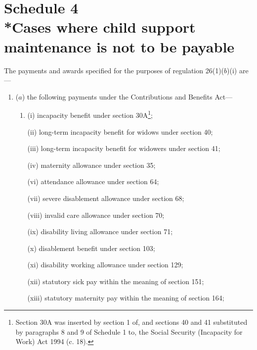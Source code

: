 \documentclass[a4paper]{article}
\newcommand{\parthead}{}
\begin{document}
\part[Schedule 4 --- Cases where child support maintenance is not to be payable]{Schedule 4\\*Cases where child support maintenance is not to be payable}

\renewcommand\parthead{--- Schedule 4}

The payments and awards specified for the purposes of regulation 26(1)($b$)(i) are—
\begin{enumerate}\item[]
($a$) the following payments under the Contributions and Benefits Act—
\begin{enumerate}\item[]
%
%

(i) incapacity benefit under section 30A\footnote{\frenchspacing Section 30A was inserted by section 1 of, and sections 40 and 41 substituted by paragraphs 8 and 9 of Schedule 1 to, the Social Security (Incapacity for Work) Act 1994 (c. 18).};

(ii) long-term incapacity benefit for widows under section 40;

(iii) long-term incapacity benefit for widowers under section 41;

(iv) maternity allowance under section 35;


(vi) attendance allowance under section 64;

(vii) severe disablement allowance under section 68;

(viii) invalid care allowance under section 70;

(ix) disability living allowance under section 71;

(x) disablement benefit under section 103;

(xi) disability working allowance under section 129;

(xii) statutory sick pay within the meaning of section 151;

(xiii) statutory maternity pay within the meaning of section 164;
\end{enumerate}


\end{enumerate}
\end{document}
